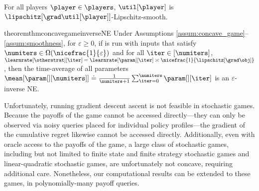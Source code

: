 \begin{assumption}
\label{assum:smoothness}
    For all players $\player \in \players$, $\util[\player]$ is $\lipschitz[{\grad \util[\player]}]$-Lipschitz-smooth.
\end{assumption}


\begin{restatable}{theorem}{thmconcavegameinverseNE}
\label{thm:concave_game_inverse_NE}
    Under Assumptions \ref{assum:concave_game}--\ref{assum:smoothness}, for $\varepsilon \geq 0$, if  is run with inputs that satisfy $\numiters \in \Omega(\nicefrac{1}{\varepsilon})$ and for all $\iter \in [\numiters]$, $\learnrate[\otherstrat][\iter] = \learnrate[\param][\iter] \asymp \nicefrac{1}{\lipschitz[\grad \obj]}$, 
    then the time-average of all parameters $\mean[{\param[][\numiters]}] \doteq \frac{1}{\numiters + 1}\sum_{\iter = 0}^\numiters \param[][\iter]$ is an $\varepsilon$-inverse NE.
\end{restatable}


Unfortunately, running gradient descent ascent is not feasible in stochastic games.
Because the payoffs of the game cannot be accessed directly---they can only be observed via noisy queries placed for individual policy profiles---the gradient of the cumulative regret likewise cannot be accessed directly. 
Additionally, even with  oracle access to the payoffs of the game, a large class of stochastic games, including but not limited to finite state and finite strategy stochastic games and linear-quadratic stochastic games, are unfortunately not concave, requiring additional care. 
Nonetheless, our computational results can be extended to these games, in polynomially-many payoff queries. 
\fi
